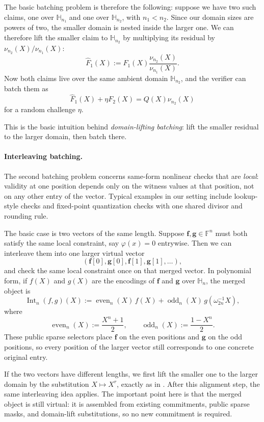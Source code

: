 The basic batching problem is therefore the following: suppose we have two such
claims, one over $\mathbb{H}_{n_1}$ and one over $\mathbb{H}_{n_2}$, with
$n_1<n_2$. Since our domain sizes are powers of two, the smaller domain is
nested inside the larger one. We can therefore lift the smaller claim to
$\mathbb{H}_{n_2}$ by multiplying its residual by
$\nu_{n_2}(X)/\nu_{n_1}(X)$:
\[
\widehat{F}_1(X):=F_1(X)\frac{\nu_{n_2}(X)}{\nu_{n_1}(X)}.
\]
Now both claims live over the same ambient domain $\mathbb{H}_{n_2}$, and the
verifier can batch them as
\[
\widehat{F}_1(X)+\eta F_2(X)=Q(X)\nu_{n_2}(X)
\]
for a random challenge $\eta$.

This is the basic intuition behind \emph{domain-lifting batching}: lift the
smaller residual to the larger domain, then batch there.

\paragraph{Interleaving batching.}
The second batching problem concerns same-form nonlinear checks that are
\emph{local}: validity at one position depends only on the witness values at
that position, not on any other entry of the vector. Typical examples in our
setting include lookup-style checks and fixed-point quantization checks with one
shared divisor and rounding rule.

The basic case is two vectors of the same length. Suppose
$\mathbf{f},\mathbf{g}\in\mathbb{F}^n$ must both satisfy the same local
constraint, say $\varphi(x)=0$ entrywise. Then we can interleave them into one
larger virtual vector
\[
(\mathbf{f}[0],\mathbf{g}[0],\mathbf{f}[1],\mathbf{g}[1],\ldots),
\]
and check the same local constraint once on that merged vector. In polynomial
form, if $f(X)$ and $g(X)$ are the encodings of $\mathbf{f}$ and $\mathbf{g}$
over $\mathbb{H}_n$, the merged object is
\[
\operatorname{Int}_n(f,g)(X)
:=
\operatorname{even}_n(X)\,f(X)
+ \operatorname{odd}_n(X)\,g(\omega_{2n}^{-1}X),
\]
where
\[
\operatorname{even}_n(X):=\frac{X^n+1}{2},
\qquad
\operatorname{odd}_n(X):=\frac{1-X^n}{2}.
\]
These public sparse selectors place $\mathbf{f}$ on the even positions and
$\mathbf{g}$ on the odd positions, so every position of the larger vector still
corresponds to one concrete original entry.

If the two vectors have different lengths, we first lift the smaller one to the
larger domain by the substitution $X\mapsto X^r$, exactly as in
. After this alignment step, the same interleaving
idea applies.
The important point here is that the merged object is still virtual: it is assembled
from existing commitments, public sparse masks, and domain-lift substitutions,
so no new commitment is required.
